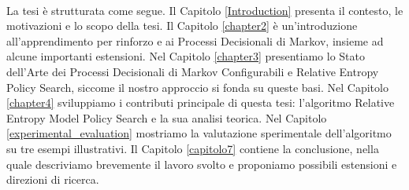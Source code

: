 \paragraph{} La tesi è strutturata come segue. Il Capitolo \ref{Introduction} presenta il contesto, le motivazioni e lo scopo della tesi. Il Capitolo \ref{chapter2} è un'introduzione all'apprendimento per rinforzo e ai Processi Decisionali di Markov, insieme ad alcune importanti estensioni. Nel Capitolo \ref{chapter3} presentiamo lo Stato dell'Arte dei Processi Decisionali di Markov Configurabili e Relative Entropy Policy Search, siccome il nostro approccio si fonda su queste basi. Nel Capitolo \ref{chapter4} sviluppiamo i contributi principale di questa tesi: l'algoritmo Relative Entropy Model Policy Search e la sua analisi teorica. Nel Capitolo \ref{experimental_evaluation} mostriamo la valutazione sperimentale dell'algoritmo su tre esempi illustrativi. Il Capitolo \ref{capitolo7} contiene la conclusione, nella quale descriviamo brevemente il lavoro svolto e proponiamo possibili estensioni e direzioni di ricerca.